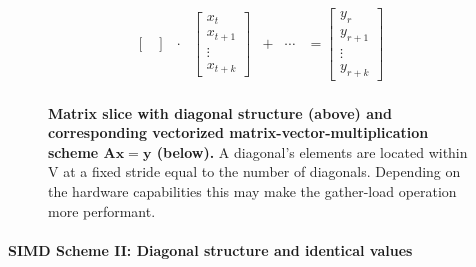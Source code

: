 \begin{figure}[ht]
$$\begin{matrix}
\begin{bmatrix}
                                                      \end{bmatrix} & \cdot & \begin{bmatrix}
                                                                                x_t \\
                                                                                x_{t+1} \\
                                                                                \vdots \\
                                                                                x_{t+k}
                                                                              \end{bmatrix} & + & \cdots & = \begin{bmatrix}
                                                                                                                 y_{r} \\
                                                                                                                 y_{r+1} \\
                                                                                                                 \vdots \\
                                                                                                                 y_{r+k}
                                                                                                                \end{bmatrix}\\

        \end{matrix}
        $$
        \caption[Matrix slice with diagonal structure and corresponding vectorized matrix-vector multiplication scheme.]{\textbf{Matrix slice with diagonal structure (above) and corresponding vectorized matrix-vector-multiplication scheme $\bm{Ax = y}$ (below).} A diagonal's elements are located within V at a fixed stride equal to the number of diagonals. Depending on the hardware capabilities this may make the gather-load operation more performant.}
        \label{fig:simd_scheme_diag}
      \end{figure}

      \paragraph{SIMD Scheme II: Diagonal structure and identical values}

